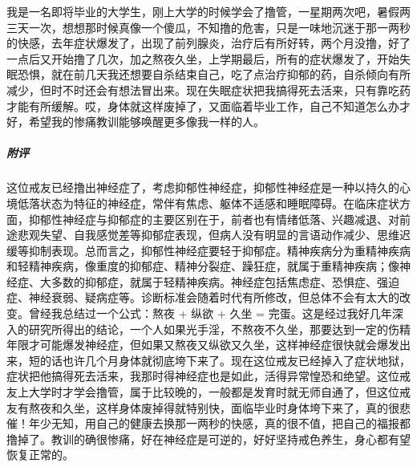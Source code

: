 \begin{case}
    我是一名即将毕业的大学生，刚上大学的时候学会了撸管，一星期两次吧，暑假两三天一次，想想那时候真像一个傻瓜，不知撸的危害，只是一味地沉迷于那一两秒的快感，去年症状爆发了，出现了前列腺炎，治疗后有所好转，两个月没撸，好了一点后又开始撸了几次，加之熬夜久坐，上学期最后，所有的症状爆发了，开始失眠恐惧，就在前几天我还想要自杀结束自己，吃了点治疗抑郁的药，自杀倾向有所减少，但时不时还会有想法冒出来。现在失眠症状把我搞得死去活来，只有靠吃药才能有所缓解。哎，身体就这样废掉了，又面临着毕业工作，自己不知道怎么办才好，希望我的惨痛教训能够唤醒更多像我一样的人。
    \subparagraph{附评} 这位戒友已经撸出神经症了，考虑抑郁性神经症，抑郁性神经症是一种以持久的心境低落状态为特征的神经症，常伴有焦虑、躯体不适感和睡眠障碍。在临床症状方面，抑郁性神经症与抑郁症的主要区别在于，前者也有情绪低落、兴趣减退、对前途悲观失望、自我感觉差等抑郁症表现，但病人没有明显的言语动作减少、思维迟缓等抑制表现。总而言之，抑郁性神经症要轻于抑郁症。精神疾病分为重精神疾病和轻精神疾病，像重度的抑郁症、精神分裂症、躁狂症，就属于重精神疾病；像神经症、大多数的抑郁症，就属于轻精神疾病。神经症包括焦虑症、恐惧症、强迫症、神经衰弱、疑病症等。诊断标准会随着时代有所修改，但总体不会有太大的改变。曾经我总结过一个公式：熬夜 + 纵欲 + 久坐 = 完蛋。这是经过我好几年深入的研究所得出的结论，一个人如果光手淫，不熬夜不久坐，那要达到一定的伤精年限才可能爆发神经症，但如果又熬夜又纵欲又久坐，这样神经症很快就会爆发出来，短的话也许几个月身体就彻底垮下来了。现在这位戒友已经掉入了症状地狱，症状把他搞得死去活来，我那时得神经症也是如此，活得异常惶恐和绝望。这位戒友上大学时才学会撸管，属于比较晚的，一般都是发育时就无师自通了，但这位戒友有熬夜和久坐，这样身体废掉得就特别快，面临毕业时身体垮下来了，真的很悲催！年少无知，用自己的健康去换那一两秒的快感，真的很不值，把自己的福报都撸掉了。教训的确很惨痛，好在神经症是可逆的，好好坚持戒色养生，身心都有望恢复正常的。
\end{case}


